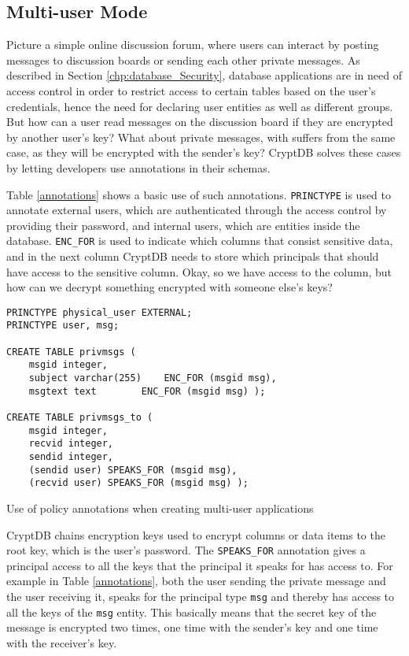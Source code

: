 \subsection{Multi-user Mode}
Picture a simple online discussion forum, where users can interact by posting messages to discussion boards or sending each other private messages. As described in Section \ref{chp:database_Security}, database applications are in need of access control in order to restrict access to certain tables based on the user's credentials, hence the need for declaring user entities as well as different groups. But how can a user read messages on the discussion board if they are encrypted by another user's key? What about private messages, with suffers from the same case, as they will be encrypted with the sender's key? CryptDB solves these cases by letting developers use annotations in their schemas.

Table \ref{annotations} shows a basic use of such annotations. \verb!PRINCTYPE! is used to annotate external users, which are authenticated through the access control by providing their password, and internal users, which are entities inside the database. \verb!ENC_FOR! is used to indicate which columns that consist sensitive data, and in the next column CryptDB needs to store which principals that should have access to the sensitive column. Okay, so we have access to the column, but how can we decrypt something encrypted with someone else's keys?

\begin{table}[H]
\begin{Verbatim}[frame=single]
PRINCTYPE physical_user EXTERNAL;
PRINCTYPE user, msg;

CREATE TABLE privmsgs (
	msgid integer,
	subject varchar(255)	ENC_FOR (msgid msg),
	msgtext text		ENC_FOR (msgid msg) );

CREATE TABLE privmsgs_to (
	msgid integer,
	recvid integer,
	sendid integer,
	(sendid user) SPEAKS_FOR (msgid msg),
	(recvid user) SPEAKS_FOR (msgid msg) ); 
\end{Verbatim}
\caption{Use of policy annotations when creating multi-user applications}
\label{annotations}
\end{table}

CryptDB chains encryption keys used to encrypt columns or data items to the root key, which is the user's password. The \verb!SPEAKS_FOR! annotation gives a principal access to all the keys that the principal it speaks for has access to. For example in Table \ref{annotations}, both the user sending the private message and the user receiving it, speaks for the principal type \verb!msg! and thereby has access to all the keys of the \verb!msg! entity. This basically means that the secret key of the message is encrypted two times, one time with the sender's key and one time with the receiver's key.

